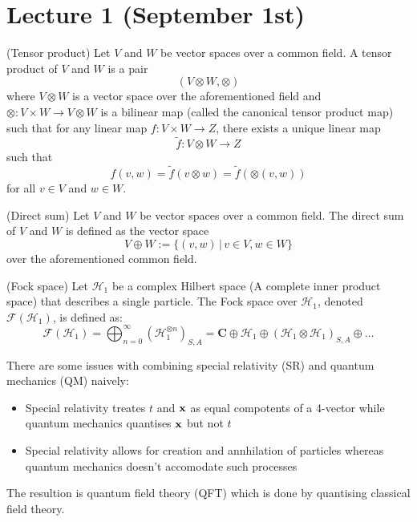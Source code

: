 \section{Lecture 1 (September 1st)}
\begin{defi}
(Tensor product) Let $V$ and $W$ be vector spaces over a common field. A tensor product of $V$ and $W$ is a pair
	\[(V\otimes W,\otimes )\]
	where $V\otimes W$ is a vector space over the aforementioned field and $\otimes :V\times W\rightarrow V\otimes W$ is a bilinear map (called the canonical tensor product map) such that for any linear map $f:V\times W\rightarrow Z$, there exists a unique linear map 
	\[\tilde{f}:V\otimes W\rightarrow Z\]
such that
	\[f(v,w)=\tilde{f}(v\otimes w)=\tilde{f}(\otimes(v,w))\]
for all $v\in V$ and $w\in W$. 
\end{defi}
\vspace{2ex}
\begin{defi}
(Direct sum) Let $V$ and $W$ be vector spaces over a common field. The direct sum of $V$ and $W$ is defined as the vector space
	\[V\oplus W:=\{(v,w) \,|\, v\in V,w\in W\}\]
over the aforementioned common field.
\end{defi}
\vspace{2ex}
\begin{defi}
(Fock space) Let $\mathcal{H}_{1}$ be a complex Hilbert space (A complete inner product space) that describes a single particle. The Fock space over $\mathcal{H}_{1}$, denoted $\mathcal{F}(\mathcal{H}_{1})$, is defined as:
	\[\mathcal{F}(\mathcal{H}_{1})=\bigoplus^{\infty }_{n=0}(\mathcal{H}_{1}^{\otimes n})_{S,A}={\bm C}\oplus \mathcal{H}_{1}\oplus(\mathcal{H}_{1}\otimes \mathcal{H}_{1})_{S,A}\oplus \ldots \] 
\end{defi}
\vspace{2ex}
\begin{rmk}
	There are some issues with combining special relativity (SR) and quantum mechanics (QM) naively:
\begin{itemize}
	\item[(i)] Special relativity treates $t$ and ${\bf x}$ as equal compotents of a 4-vector while quantum mechanics quantises ${\bf x}$ but not $t$
	\item[(ii)] Special relativity allows for creation and annhilation of particles whereas quantum mechanics doesn't accomodate such processes 
\end{itemize}
	The resultion is quantum field theory (QFT) which is done by quantising classical field theory.
\end{rmk}
